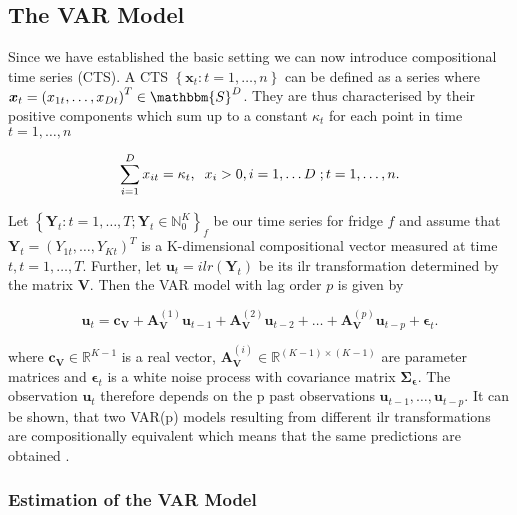 \subsection{The VAR Model}
\label{sec:The VAR Model}

Since we have established the basic setting we can now introduce compositional time series (CTS). A CTS $\left\{\bm{x}_t:t=1,\ldots,n \right\}$ can be defined as a series where $\bm{x}_t = \left(x_{1t},\ldots,x_{Dt}\right)^T \in \mathbbm{S}^D$. They are thus characterised by their positive components which sum up to a constant $\kappa_t$ for each point in time $t=1,\ldots,n$ 

\begin{equation*}
\sum_{i=1}^D x_{it} = \kappa_t, \hspace{0.2cm} x_i > 0, i=1,\ldots D \hspace{0.1cm}; t=1,\ldots, n. 
\label{eq:CTS characterisation}
\end{equation*} 

Let $\left\{\bm{Y}_t:t=1,\ldots,T; \bm{Y}_t \in \mathbb{N}_0^K \right\}_f$ be our time series for fridge $f$ and assume that $\bm{Y}_t=(Y_{1t},\ldots,Y_{Kt})^T$ is a K-dimensional compositional vector measured at time $t, t=1,\ldots,T$. Further, let $\textbf{u}_t = ilr(\bm{Y}_t)$ be its ilr transformation determined by the matrix $\textbf{V}$. Then the VAR model with lag order $p$ is given by \cite{Kynclova:2015}

\begin{equation}
\textbf{u}_t = \textbf{c}_{\textbf{V}} + \textbf{A}_{\textbf{V}}^{(1)}\textbf{u}_{t-1} + \textbf{A}_{\textbf{V}}^{(2)}\textbf{u}_{t-2} + \ldots + \textbf{A}_{\textbf{V}}^{(p)}\textbf{u}_{t-p} + \bm{\epsilon}_{t}.
\label{eq:VAR model}
\end{equation}

where $\textbf{c}_{\textbf{V}} \in \mathbb{R}^{K-1}$ is a real vector, $\textbf{A}_{\textbf{V}}^{(i)} \in \mathbb{R}^{(K-1) \times (K-1)}$ are parameter matrices and $\bm{\epsilon}_t$ is a white noise process with covariance matrix $\bm{\Sigma_\epsilon}$. The observation $\textbf{u}_t$ therefore depends on the p past observations $\textbf{u}_{t-1},\ldots,\textbf{u}_{t-p}$. It can be shown, that two VAR(p) models resulting from different ilr transformations are compositionally equivalent which means that the same predictions are obtained \cite{Kynclova:2015}. 


\subsubsection{Estimation of the VAR Model}
\label{sec: Estimation of the Var Model}


